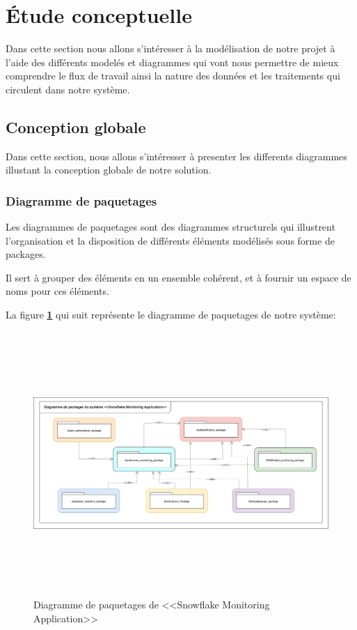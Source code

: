 \section{Étude conceptuelle}
\par Dans cette section nous allons s'intéresser à la modélisation de notre projet à l'aide des différents modelés et diagrammes qui vont nous permettre de mieux comprendre le flux de travail ainsi la nature des données et les traitements qui circulent dans notre système.
\subsection{Conception globale}
    \par Dans cette section, nous allons s'intéresser à presenter les differents diagrammes illustant la conception globale de notre solution.
    \subsubsection{Diagramme de paquetages}
    \par Les diagrammes de paquetages sont des diagrammes structurels qui illustrent l'organisation et la disposition de différents éléments modélisés sous forme de packages\cite{diag_pack}.

    \par Il sert à grouper des éléments en un ensemble cohérent, et à fournir un espace de noms pour ces éléments.\par La figure \textbf{\ref{fig:e_a}} qui suit représente le diagramme de paquetages de notre système: 
            \begin{figure}[H]
            \centering
            \includegraphics[width =1\linewidth , height=10cm]{img/conception/diag_pack.png}
            \caption{Diagramme de paquetages de <<Snowflake Monitoring Application>>}
            \label{fig:e_a}
            \end{figure}
